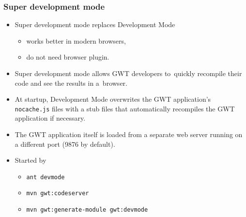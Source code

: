 \documentclass[10pt,table, xcolor=pdflatex]{beamer}
\begin{document}
\begin{frame}\frametitle{Super development mode}
	\begin{itemize}
		\item Super development mode replaces Development Mode
          \begin{itemize}
        	\item works better in modern browsers,
            \item do not need browser plugin.
          \end{itemize}
		\item Super development mode allows GWT developers to~quickly recompile their code and see the results in a~browser.
        \item At startup, Development Mode overwrites the GWT application's \texttt{nocache.js} files with a stub files that automatically recompiles the GWT application if necessary.
        \item The GWT application itself is loaded from a separate web server running on a different port (9876 by default).
        \item Started by
          \begin{itemize}
        	\item \texttt{ant devmode}
            \item \texttt{mvn gwt:codeserver}
            \item \texttt{mvn gwt:generate-module gwt:devmode}
          \end{itemize}
	\end{itemize}
\end{frame}
\end{document}
